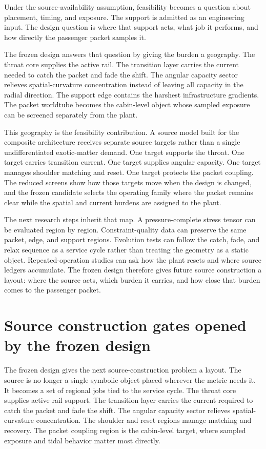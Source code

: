 \documentclass[11pt]{article}
\begin{document}
Under the source-availability assumption, feasibility becomes a question about placement, timing, and exposure. The support is admitted as an engineering input. The design question is where that support acts, what job it performs, and how directly the passenger packet samples it.

The frozen design answers that question by giving the burden a geography. The throat core supplies the active rail. The transition layer carries the current needed to catch the packet and fade the shift. The angular capacity sector relieves spatial-curvature concentration instead of leaving all capacity in the radial direction. The support edge contains the harshest infrastructure gradients. The packet worldtube becomes the cabin-level object whose sampled exposure can be screened separately from the plant.

This geography is the feasibility contribution. A source model built for the composite architecture receives separate source targets rather than a single undifferentiated exotic-matter demand. One target supports the throat. One target carries transition current. One target supplies angular capacity. One target manages shoulder matching and reset. One target protects the packet coupling. The reduced screens show how those targets move when the design is changed, and the frozen candidate selects the operating family where the packet remains clear while the spatial and current burdens are assigned to the plant.

The next research steps inherit that map. A pressure-complete stress tensor can be evaluated region by region. Constraint-quality data can preserve the same packet, edge, and support regions. Evolution tests can follow the catch, fade, and relax sequence as a service cycle rather than treating the geometry as a static object. Repeated-operation studies can ask how the plant resets and where source ledgers accumulate. The frozen design therefore gives future source construction a layout: where the source acts, which burden it carries, and how close that burden comes to the passenger packet.

\section{Source construction gates opened by the frozen design}

The frozen design gives the next source-construction problem a layout. The source is no longer a single symbolic object placed wherever the metric needs it. It becomes a set of regional jobs tied to the service cycle. The throat core supplies active rail support. The transition layer carries the current required to catch the packet and fade the shift. The angular capacity sector relieves spatial-curvature concentration. The shoulder and reset regions manage matching and recovery. The packet coupling region is the cabin-level target, where sampled exposure and tidal behavior matter most directly.
\end{document}
